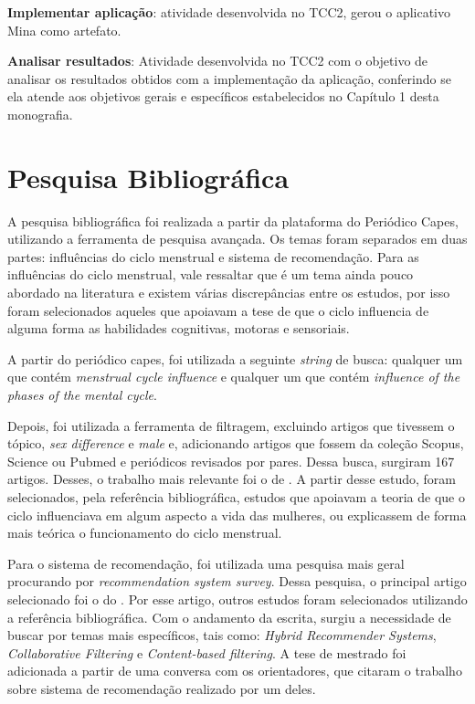 \textbf{Implementar aplicação}: atividade desenvolvida no TCC2, gerou o aplicativo Mina como artefato.

\textbf{Analisar resultados}: Atividade desenvolvida no TCC2 com o objetivo de
analisar os resultados obtidos com a implementação da aplicação, conferindo se ela atende 
aos objetivos gerais e específicos estabelecidos no Capítulo 1 desta monografia.

\section{Pesquisa Bibliográfica}

A pesquisa bibliográfica foi realizada a partir da plataforma do Periódico Capes, utilizando a ferramenta de pesquisa avançada.
Os temas foram separados em duas partes: influências do ciclo menstrual e sistema de recomendação.
Para as influências do ciclo menstrual, vale ressaltar que é um tema ainda pouco abordado na literatura e existem 
várias discrepâncias entre os estudos, por isso foram selecionados aqueles que apoiavam a tese de que 
o ciclo influencia de alguma forma as habilidades cognitivas, motoras e sensoriais. 

A partir do periódico capes, foi utilizada a seguinte \emph{string} de busca:
qualquer um que contém \emph{menstrual cycle influence} e qualquer um que contém 
\emph{influence of the phases of the mental cycle}. 

Depois, foi utilizada a ferramenta de filtragem, excluindo artigos que tivessem o tópico, \emph{sex difference} e \emph{male}
 e, adicionando artigos que fossem da coleção Scopus, Science ou Pubmed e periódicos revisados por pares. Dessa busca, surgiram 167 artigos.
Desses, o trabalho mais relevante foi o de . A partir desse estudo, foram selecionados, pela referência bibliográfica, estudos que apoiavam 
a teoria de que o ciclo influenciava em algum aspecto a vida das mulheres, ou explicassem de forma mais teórica o funcionamento do ciclo menstrual.


Para o sistema de recomendação, foi utilizada uma pesquisa mais geral procurando por \emph{recommendation system survey}. Dessa pesquisa, o principal artigo selecionado foi o 
do . Por esse artigo, outros estudos foram selecionados utilizando a referência bibliográfica. Com o andamento da escrita, surgiu a necessidade de buscar
por temas mais específicos, tais como: \emph{Hybrid Recommender Systems}, \emph{Collaborative Filtering} e \emph{Content-based filtering}. A tese de mestrado \cite{mauricio} foi adicionada a partir 
de uma conversa com os orientadores, que citaram o trabalho sobre sistema de recomendação realizado por um deles.


